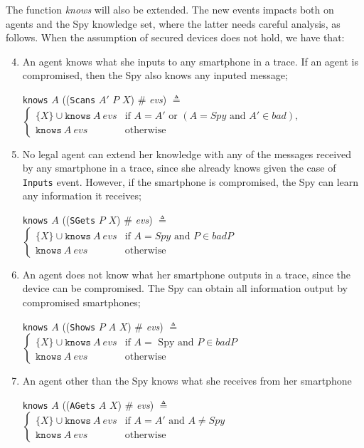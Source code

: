 The function \textit{knows} will also be extended. The new events impacts both on agents and the Spy knowledge set, where the latter needs careful analysis, as follows. When the assumption of secured devices does not hold, we have that:
\begin{enumerate}
  \setcounter{enumi}{3}
  \item An agent knows what she inputs to any smartphone in a trace. If an agent is compromised, then the Spy also knows any inputed message;
  \begin{center}
    \texttt{knows} $A$ ((\texttt{Scans} $A'$ $P$ $X$) $\#$ \textit{evs}) $\triangleq$ $\begin{cases}
      \{ X\} \cup \texttt{knows}\ A\ evs & \text{if } A = A' \text{ or } (A = Spy \text{ and } A' \in bad), \\
      \texttt{knows}\ A\ evs & \text{otherwise}
    \end{cases}$
  \end{center}

  \item No legal agent can extend her knowledge with any of the messages received by any smartphone in a trace, since she already knows given the case of \texttt{Inputs} event. However, if the smartphone is compromised, the Spy can learn any information it receives;
  \begin{center}
    \texttt{knows} $A$ ((\texttt{SGets} $P$ $X$) $\#$ \textit{evs}) $\triangleq$ $\begin{cases}
      \{ X\} \cup \texttt{knows}\ A\ evs & \text{if } A = Spy \text{ and } P \in badP\\
      \texttt{knows}\ A\ evs & \text{otherwise}
    \end{cases}$
  \end{center}

  \item An agent does not know what her smartphone outputs in a trace, since the device can be compromised. The Spy can obtain all information output by compromised smartphones;
  \begin{center}
    \texttt{knows} $A$ ((\texttt{Shows} $P$ $A$ $X$) $\#$ \textit{evs}) $\triangleq$ $\begin{cases}
      \{ X\} \cup \texttt{knows}\ A\ evs & \text{if } A = \text{ Spy and } P \in badP \\
      \texttt{knows}\ A\ evs & \text{otherwise}
    \end{cases}$
  \end{center}

  \item An agent other than the Spy knows what she receives from her smartphone
  \begin{center}
    \texttt{knows} $A$ ((\texttt{AGets} $A$ $X$) $\#$ \textit{evs}) $\triangleq$ $\begin{cases}
      \{ X\} \cup \texttt{knows}\ A\ evs & \text{if } A = A' \text{ and } A \neq Spy \\
      \texttt{knows}\ A\ evs & \text{otherwise}
    \end{cases}$
  \end{center}
\end{enumerate}

